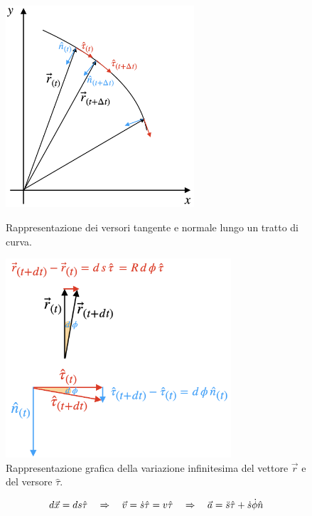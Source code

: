 \begin{figure}[htbp]
    \begin{minipage}[htbp]{0.45\textwidth}
        \center
            \includegraphics[width=7cm]{images/coordcurv.png}
            \caption{Rappresentazione dei versori tangente e normale lungo
            un tratto di curva.}
    \label{fig:curvilines}
    \end{minipage}
    \hfill
    \begin{minipage}[htbp]{0.51\textwidth}
        \center
            \includegraphics[width=8.4cm]{images/drdtau.png}
            \caption{Rappresentazione grafica della variazione infinitesima del vettore $\vec r$ e del versore $\hat\tau$.}
    \label{fig:drdtau}
    \end{minipage}
    \hfill
\end{figure}

\begin{equation}
    d\vec x = ds\hat\tau\quad\Rightarrow\quad \vec v = \dot s \hat\tau = v\hat\tau\quad\Rightarrow\quad
    \vec a = \ddot s\hat\tau + \dot s\dot\phi\hat n
\end{equation}

